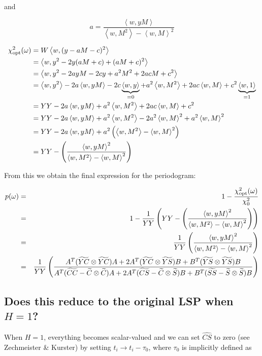 \documentclass[notitlepage]{article}
\newcommand{\Cc}[1][n]{\widetilde{C}}
\newcommand{\Ss}[1][n]{\widetilde{S}}
\newcommand{\CCc}[1][nm]{\widetilde{CC}}
\newcommand{\SSs}[1][nm]{\widetilde{SS}}
\newcommand{\CS}[1][nm]{\widetilde{CS}}
\newcommand{\YC}[1][n]{\widetilde{YC}}
\newcommand{\YS}[1][n]{\widetilde{YS}}
\newcommand{\YY}{YY}
\newcommand{\hatCS}[1][nm]{\widehat{CS}}
\newcommand{\iprod}[2]{\left<#1, #2\right>}
\newcommand{\oprod}[2]{#1 \otimes #2}
\begin{document}
and

\begin{equation}
a = \frac{\iprod{w}{yM}}{\iprod{w}{M^2} - \iprod{w}{M}^2}
\end{equation}

\begin{align*}
\chi^2_{\rm opt}(\omega) &= W\iprod{w}{(y - aM - c)^2}\\
&= \iprod{w}{y^2 - 2y(aM + c) + (aM + c)^2}\\
&= \iprod{w}{y^2 - 2ayM - 2cy + a^2M^2 + 2acM + c^2}\\
&= \iprod{w}{y^2} - 2a\iprod{w}{yM} - 2c\underbrace{\iprod{w}{y}}_{=0} + a^2\iprod{w}{M^2} + 2ac\iprod{w}{M} + c^2\underbrace{\iprod{w}{1}}_{=1}\\
&= \YY - 2a\iprod{w}{yM} + a^2\iprod{w}{M^2} + 2ac\iprod{w}{M} + c^2\\
&= \YY - 2a\iprod{w}{yM} + a^2\iprod{w}{M^2} - 2a^2\iprod{w}{M}^2 + a^2\iprod{w}{M}^2\\
&= \YY - 2a\iprod{w}{yM} + a^2\left(\iprod{w}{M^2} - \iprod{w}{M}^2\right)\\
&= \YY - \left(\frac{\iprod{w}{yM}^2}{\iprod{w}{M^2} - \iprod{w}{M}^2}\right)
\end{align*}

From this we obtain the final expression for the periodogram:

\begin{eqnarray}
p(\omega) &=& 1 - \frac{\chi^2_{\rm opt}(\omega)}{\chi^2_0}\\
		&=& 1 - \frac{1}{\YY}\left(\YY - \left(\frac{\iprod{w}{yM}^2}{\iprod{w}{M^2} - \iprod{w}{M}^2}\right)\right)\\
		&=& \frac{1}{\YY}\left(\frac{\iprod{w}{yM}^2}{\iprod{w}{M^2} - \iprod{w}{M}^2}\right)\\
		&=& \frac{1}{\YY}\left(\frac{ A^T(\oprod{\YC}{\YC})A + 2A^T(\oprod{\YC}{\YS})B + B^T(\oprod{\YS}{\YS})B}{ A^T(\CCc - \oprod{\Cc}{\Cc}) A + 2A^T(\CS - \oprod{\Cc}{\Ss}) B + B^T(\SSs - \oprod{\Ss}{\Ss}) B }\right)
\end{eqnarray}


\subsection{Does this reduce to the original LSP when $H=1$?}
When $H = 1$, everything becomes scalar-valued and we can set $\hatCS$ to zero (see Zechmeister \& Kurster) by setting $t_i \rightarrow t_i - \tau_0$, where $\tau_0$ is implicitly defined as
\end{document}
